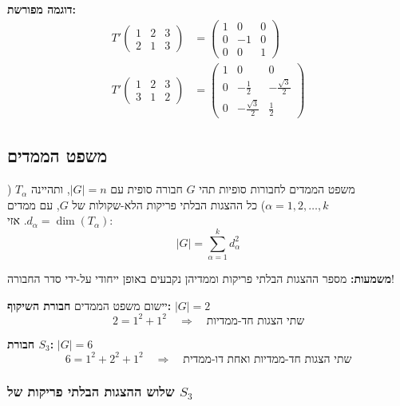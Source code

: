 \textbf{דוגמה מפורשת:}
\begin{align*}
T'\begin{pmatrix} 1 & 2 & 3 \\ 2 & 1 & 3 \end{pmatrix} &= 
\begin{pmatrix} 1 & 0 & 0 \\ 0 & -1 & 0 \\ 0 & 0 & 1 \end{pmatrix} \\
T'\begin{pmatrix} 1 & 2 & 3 \\ 3 & 1 & 2 \end{pmatrix} &=
\begin{pmatrix} 1 & 0 & 0 \\ 0 & -\frac{1}{2} & -\frac{\sqrt{3}}{2} \\ 0 & -\frac{\sqrt{3}}{2} & \frac{1}{2} \end{pmatrix}
\end{align*}

\subsection{משפט הממדים}

\begin{theorembox}{משפט הממדים לחבורות סופיות}
תהי $G$ חבורה סופית עם $|G| = n$, ותהיינה $T_\alpha$ ($\alpha = 1, 2, \ldots, k$) כל ההצגות הבלתי פריקות הלא-שקולות של $G$, עם ממדים $d_\alpha = \dim(T_\alpha)$. אזי:
\[
\boxed{|G| = \sum_{\alpha=1}^{k} d_\alpha^2}
\]
\end{theorembox}

\textbf{משמעות:} מספר ההצגות הבלתי פריקות וממדיהן נקבעים באופן ייחודי על-ידי סדר החבורה!

\begin{examplebox}{יישום משפט הממדים}
\textbf{חבורת השיקוף:} $|G| = 2$
\[
2 = 1^2 + 1^2 \quad \Rightarrow \quad \text{שתי הצגות חד-ממדיות}
\]

\textbf{חבורת $S_3$:} $|G| = 6$
\[
6 = 1^2 + 2^2 + 1^2 \quad \Rightarrow \quad \text{שתי הצגות חד-ממדיות ואחת דו-ממדית}
\]
\end{examplebox}

\subsubsection{שלוש ההצגות הבלתי פריקות של $S_3$}

